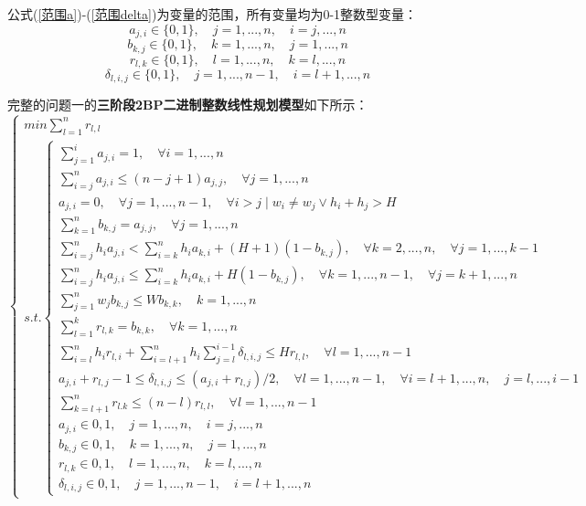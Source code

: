 \documentclass[bwprint]{gmcmthesis}
\begin{document}
公式(\ref{范围a})-(\ref{范围delta})为变量的范围，所有变量均为0-1整数型变量：
\begin{equation}
    a_{j,i} \in \{0,1\}, \quad j=1,...,n , \quad i=j,...,n \label{范围a}
\end{equation}
\begin{equation}
    b_{k,j} \in \{0,1\}, \quad k=1,...,n , \quad j=1,...,n \label{范围b}
\end{equation}
\begin{equation}
    r_{l,k} \in \{0,1\}, \quad l=1,...,n , \quad k=l,...,n \label{范围r}
\end{equation}
\begin{equation}
    \delta_{l,i,j} \in \{0,1\}, \quad j=1,...,n-1 , \quad i=l+1,...,n \label{范围delta}
\end{equation}

完整的问题一的\textbf{三阶段2BP二进制整数线性规划模型}如下所示：
\begin{equation}
    \begin{cases}
        min \sum_{l=1}^{n}  r_{l,l} \\
        s.t.
        \begin{cases}
            \sum_{j=1}^{i}  a_{j,i} =1,\quad \forall i=1,...,n \\
            \sum_{i=j}^{n}  a_{j,i} \le (n-j+1)a_{j,j},\quad \forall j=1,...,n  \\
            a_{j,i}=0, \quad \forall j=1,...,n-1,\quad  \forall i>j \mid w_i \neq w_j \vee h_i+h_j>H\\
            \sum_{k=1}^{n}  b_{k,j} =a_{j,j},\quad \forall j=1,...,n  \\
            \sum_{i=j}^{n} h_ia_{j,i}<\sum_{i=k}^n h_i a_{k,i}+(H+1)(1-b_{k,j}),\quad  \forall  k=2,...,n,\quad  \forall j=1,...,k-1 \\
            \sum_{i=j}^{n} h_ia_{j,i} \le \sum_{i=k}^n h_i a_{k,i}+H(1-b_{k,j}), \quad  \forall k=1,...,n-1, \quad \forall j=k+1,...,n \\
            \sum_{j=1}^{n} w_j b_{k,j} \le W b_{k,k}, \quad k=1,...,n \\
            \sum_{l=1}^{k} r_{l,k} = b_{k,k}, \quad \forall k=1,...,n \\
            \sum_{i=l}^{n} h_i r_{l,i} +\sum_{i=l+1}^{n} h_i \sum_{j=l}^{i-1} \delta_{l,i,j} \le H r_{l,l}, \quad \forall l=1,...,n-1 \\
            a_{j,i}+r_{l,j}-1 \le \delta_{l,i,j} \le (a_{j,i}+r_{l,j})/2, \quad \forall l=1,...,n-1,\quad \forall i=l+1,...,n,\quad j=l,...,i-1 \\
           \sum_{k=l+1}^{n} r_{l.k} \le (n-l)r_{l,l}, \quad \forall l=1,...,n-1 \\
            a_{j,i} \in {0,1}, \quad j=1,...,n , \quad i=j,...,n \\
            b_{k,j} \in {0,1}, \quad k=1,...,n , \quad j=1,...,n \\
            r_{l,k} \in {0,1}, \quad l=1,...,n , \quad k=l,...,n \\
            \delta_{l,i,j} \in {0,1}, \quad j=1,...,n-1 , \quad i=l+1,...,n 
        \end{cases}  \label{问题一模型}
    \end{cases}
\end{equation}
\end{document}
